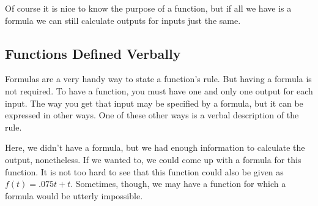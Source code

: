 Of course it is nice to know the purpose of a function, but if all we have is a formula we can still calculate outputs for inputs just the same.



%
%

\subsection{Functions Defined Verbally}

Formulas are a very handy way to state a function’s rule. But having a formula is not required. To have a function, you must have one and only one output for each input. The way you get that input may be specified by a formula, but it can be expressed in other ways. One of these other ways is a verbal description of the rule.



Here, we didn’t have a formula, but we had enough information to calculate the output, nonetheless. If we wanted to, we could come up with a formula for this function. It is not too hard to see that this function could also be given as $f(t)=.075t+t$. Sometimes, though, we may have a function for which a formula would be utterly impossible.


